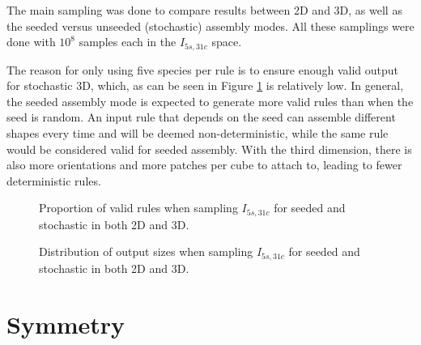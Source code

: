 
The main sampling was done to compare results between 2D and 3D, as well as the seeded versus unseeded (stochastic) assembly modes. All these samplings were done with \(10^8\) samples each in the \(I_{5s,31c}\) space.

The reason for only using five species per rule is to ensure enough valid output for stochastic 3D, which, as can be seen in Figure \ref{fig:valid_proportion} is relatively low. In general, the seeded assembly mode is expected to generate more valid rules than when the seed is random. An input rule that depends on the seed can assemble different shapes every time and will be deemed non-deterministic, while the same rule would be considered valid for seeded assembly. With the third dimension, there is also more orientations and more patches per cube to attach to, leading to fewer deterministic rules.


\begin{figure}[h]
    \centering
    \caption{Proportion of valid rules when sampling \(I_{5s,31c}\) for seeded and stochastic in both 2D and 3D.}
    \label{fig:valid_proportion}
\end{figure}


\begin{figure}[h]
    \centering
    \caption{Distribution of output sizes when sampling \(I_{5s,31c}\) for seeded and stochastic in both 2D and 3D.}
\end{figure}

\section{Symmetry}

